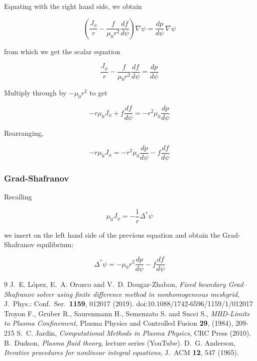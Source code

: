 \documentclass[11pt,a4paper]{article}
\begin{document}
    Equating with the right hand side, we obtain

    $$\left(\frac{J_\phi}{r}-\frac{f}{\mu_0 r^2}\frac{d f}{d\psi}\right)\nabla\psi=\frac{dp}{d\psi}\,\nabla\psi$$

    from which we get the scalar equation 

    $$\frac{J_\phi}{r}-\frac{f}{\mu_0 r^2}\frac{d f}{d\psi}=\frac{dp}{d\psi}$$

    Multiply through by $-\mu_0r^2$ to get

    $$-r\mu_0J_\phi+f\frac{df}{d\psi}=-r^2\mu_0\frac{dp}{d\psi}$$

    Rearranging,

    $$-r\mu_0J_\phi=-r^2\mu_0\frac{dp}{d\psi}-f\frac{df}{d\psi}$$

    \subsubsection{Grad-Shafranov}
    
    Recalling 

    $$\mu_0J_\phi=-\frac{1}{r}\Delta^*\psi$$

    we insert on the left hand side of the previous equation and obtain the Grad-Shafranov equilibrium:

    $$\boxed{\Delta^*\psi=-\mu_0r^2\frac{dp}{d\psi}-f\frac{df}{d\psi}}$$



\begin{thebibliography}{9}
 J.~E. L\'opez, E.~A. Orozco and V.~D. Dougar-Zhabon, \emph{Fixed boundary Grad--Shafranov solver using finite difference method in nonhomogeneous meshgrid}, J.\ Phys.: Conf.\ Ser.\ \textbf{1159}, 012017 (2019). doi:10.1088/1742-6596/1159/1/012017
 Troyon F., Gruber R., Saurenmann H., Semenzato S. and Succi S., \emph{MHD-Limits to Plasma Confinement},
Plasma Physics and Controlled Fusion \textbf{29}, (1984), 209-215
 S.~C. Jardin, \emph{Computational Methods in Plasma Physics}, CRC Press (2010).
 B.~Dudson, \emph{Plasma fluid theory}, lecture series (YouTube).
 D.~G. Anderson, \emph{Iterative procedures for nonlinear integral equations}, J.\ ACM \textbf{12}, 547 (1965).
\end{thebibliography}
\end{document}
